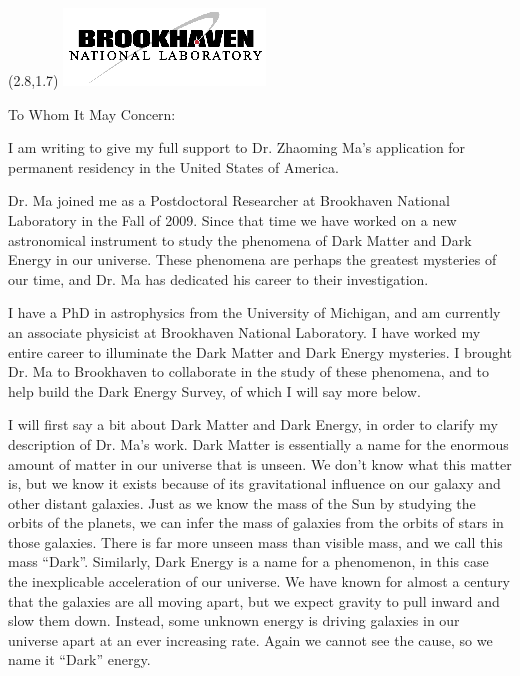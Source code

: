 \documentclass[12pt]{letter}
\begin{document}
\begin{textblock}{2}(2.8,1.7)
\includegraphics[scale=2.0]{bnl-logo}
\end{textblock}

\begin{letter}{}

\opening{To Whom It May Concern:}

I am writing to give my full support to Dr. Zhaoming Ma's application for
permanent residency in the United States of America.

Dr. Ma joined me as a Postdoctoral Researcher at Brookhaven National Laboratory
in the Fall of 2009.  Since that time we have worked on a new astronomical
instrument to study the phenomena of Dark Matter and Dark Energy in our
universe.  These phenomena are perhaps the greatest mysteries of our time, and
Dr. Ma has dedicated his career to their investigation.

I have a PhD in astrophysics from the University of Michigan, and am currently
an associate physicist at Brookhaven National Laboratory.  I have worked my
entire career to illuminate the Dark Matter and Dark Energy mysteries.  I
brought Dr. Ma to Brookhaven to collaborate in the study of these phenomena,
and to help build the Dark Energy Survey, of which I will say more below.

I will first say a bit about Dark Matter and Dark Energy, in order to clarify
my description of Dr. Ma's work.  Dark Matter is essentially a name for the
enormous amount of matter in our universe that is unseen.  We don't know what
this matter is, but we know it exists because of its gravitational influence on
our galaxy and other distant galaxies.  Just as we know the mass of the Sun by
studying the orbits of the planets, we can infer the mass of galaxies from the
orbits of stars in those galaxies.  There is far more unseen mass than visible
mass, and we call this mass ``Dark''.  Similarly, Dark Energy is a name for a
phenomenon, in this case the inexplicable acceleration of our universe. We have
known for almost a century that the galaxies are all moving apart, but we
expect gravity to pull inward and slow them down.  Instead, some unknown energy
is driving galaxies in our universe apart at an ever increasing rate.  Again
we cannot see the cause, so we name it ``Dark'' energy.


\end{letter}
\end{document}
